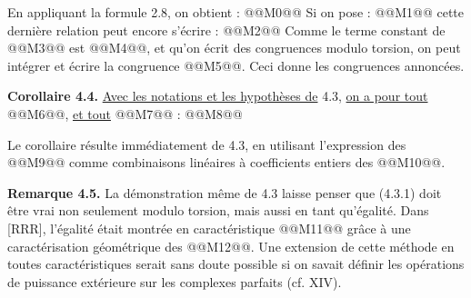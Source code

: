 
En
appliquant la formule 2.8, on obtient :
@@M0@@
Si on pose :
@@M1@@
cette dernière relation peut encore s'écrire :
@@M2@@
Comme le terme constant de @@M3@@ est @@M4@@, et qu'on écrit des congruences modulo torsion, on peut intégrer et écrire la congruence @@M5@@. Ceci donne les congruences annoncées.

\textbf{Corollaire 4.4.} \uline{Avec les notations et les hypothèses de} 4.3, \uline{on a pour tout} @@M6@@, \uline{et tout} @@M7@@ :
@@M8@@

Le corollaire résulte immédiatement de 4.3, en utilisant l'expression des @@M9@@ comme combinaisons linéaires à coefficients entiers des @@M10@@.

\textbf{Remarque 4.5.} La démonstration même de 4.3 laisse penser que (4.3.1) doit être vrai non seulement modulo torsion, mais aussi en tant qu'égalité. Dans [RRR], l'égalité était montrée en caractéristique @@M11@@ grâce à une caractérisation géométrique des @@M12@@. Une extension de cette méthode en toutes caractéristiques serait sans doute possible si on savait définir les opérations de puissance extérieure sur les complexes parfaits (cf. XIV).

